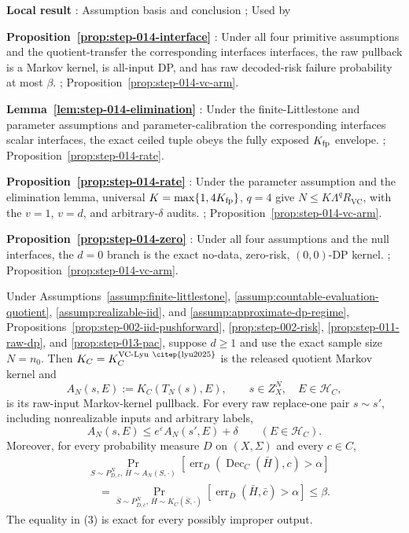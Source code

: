 \noindent\textbf{ Local result }:  Assumption basis and conclusion ;  Used by \par
\noindent\textbf{ Proposition~\ref{prop:step-014-interface} }:  Under all four primitive assumptions and the quotient-transfer the corresponding interfaces interfaces, the raw pullback is a Markov kernel, is all-input DP, and has raw decoded-risk failure probability at most \(\beta\). ;  Proposition~\ref{prop:step-014-vc-arm}. \par
\noindent\textbf{ Lemma~\ref{lem:step-014-elimination} }:  Under the finite-Littlestone and parameter assumptions and parameter-calibration the corresponding interfaces scalar interfaces, the exact ceiled tuple obeys the fully exposed \(K_{\rm fp}\) envelope. ;  Proposition~\ref{prop:step-014-rate}. \par
\noindent\textbf{ Proposition~\ref{prop:step-014-rate} }:  Under the parameter assumption and the elimination lemma, universal \(K=\max\{1,4K_{\rm fp}\}\), \(q=4\) give \(N\leq K\Lambda^qR_{\mathrm{VC}}\), with the \(v=1\), \(v=d\), and arbitrary-\(\delta\) audits. ;  Proposition~\ref{prop:step-014-vc-arm}. \par
\noindent\textbf{ Proposition~\ref{prop:step-014-zero} }:  Under all four assumptions and the  null interfaces, the \(d=0\) branch is the exact no-data, zero-risk, \((0,0)\)-DP kernel. ;  Proposition~\ref{prop:step-014-vc-arm}. \par



\begin{proposition}\label{prop:step-014-interface}
Under Assumptions~\ref{assump:finite-littlestone},
\ref{assump:countable-evaluation-quotient},
\ref{assump:realizable-iid}, and
\ref{assump:approximate-dp-regime}, 
Propositions~\ref{prop:step-002-iid-pushforward},
\ref{prop:step-002-risk},
\ref{prop:step-011-raw-dp}, and
\ref{prop:step-013-pac}, suppose \(d\geq1\) and use the exact sample size
\(N=n_0\). Then \(K_C=K_C^{\mathrm{VC\text{-}Lyu~\citep{lyu2025}}}\) is the released
quotient Markov kernel and
\[
 A_N(s,E):=K_C(T_N(s),E),
 \qquad s\in Z_X^N,\quad E\in\mathcal H_C,
\tag{1}
\]
is its raw-input Markov-kernel pullback. For every raw replace-one pair
\(s\sim s'\), including nonrealizable inputs and arbitrary labels,
\[
 A_N(s,E)\leq e^\varepsilon A_N(s',E)+\delta
 \qquad(E\in\mathcal H_C).
\tag{2}
\]
Moreover, for every probability measure \(D\) on \((X,\Sigma)\) and every
\(c\in C\),
\[
\begin{aligned}
&\Pr_{S\sim P_{D,c}^N,\,\bar H\sim A_N(S,\cdot)}
 \left[
 \operatorname{err}_D(\operatorname{Dec}_C(\bar H),c)>\alpha
 \right]\\
&\quad =
\Pr_{\bar S\sim P_{\bar D,\bar c}^N,\,
      \bar H\sim K_C(\bar S,\cdot)}
 \left[
 \operatorname{err}_{\bar D}(\bar H,\bar c)>\alpha
 \right]
\leq\beta.
\end{aligned}
\tag{3}
\]
The equality in (3) is exact for every possibly improper output.


\end{proposition}

